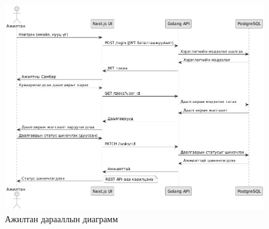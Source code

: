 \begin{figure}[H]
    \centering
    \includegraphics[scale=0.5]{src/images/diagram/employee_seq.png}
    \caption{Ажилтан дарааллын диаграмм}
    \label{fig:emp_seq}
\end{figure}